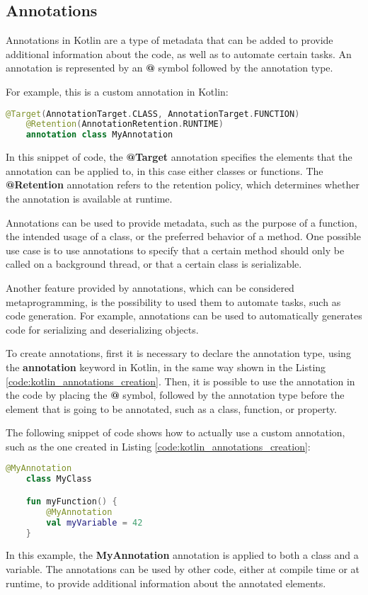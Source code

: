 \subsection{Annotations}
Annotations \cite{annotation_documentation} in Kotlin are a type of metadata that can be added to provide additional information about the code, as well as to automate certain tasks.\newline
An annotation is represented by an \textbf{@} symbol followed by the annotation type.

For example, this is a custom annotation in Kotlin:
\begin{lstlisting}[caption={Example of custom annotation in Kotlin}, language=Kotlin, captionpos=b, label={code:kotlin_annotations_creation}]
    @Target(AnnotationTarget.CLASS, AnnotationTarget.FUNCTION)
    @Retention(AnnotationRetention.RUNTIME)
    annotation class MyAnnotation
\end{lstlisting}
In this snippet of code, the \textbf{@Target} annotation specifies the elements that the annotation can be applied to, in this case either classes or functions. The \textbf{@Retention} annotation refers to the retention policy, which determines whether the annotation is available at runtime.

Annotations can be used to provide metadata, such as the purpose of a function, the intended usage of a class, or the preferred behavior of a method. One possible use case is to use annotations to specify that a certain method should only be called on a background thread, or that a certain class is serializable.

Another feature provided by annotations, which can be considered metaprogramming, is the possibility to used them to automate tasks, such as code generation. For example, annotations can be used to automatically generates code for serializing and deserializing objects.

To create annotations, first it is necessary to declare the annotation type, using the \textbf{annotation} keyword in Kotlin, in the same way shown in the Listing \ref{code:kotlin_annotations_creation}.\newline
Then, it is possible to use the annotation in the code by placing the \textbf{@} symbol, followed by the annotation type before the element that is going to be annotated, such as a class, function, or property.

The following snippet of code shows how to actually use a custom annotation, such as the one created in Listing \ref{code:kotlin_annotations_creation}:
\begin{lstlisting}[caption={Example of usage of a custom annotation in Kotlin}, language=Kotlin, captionpos=b, label={code:kotlin_annotations_usage}]
    @MyAnnotation
    class MyClass

    fun myFunction() {
        @MyAnnotation
        val myVariable = 42
    }
\end{lstlisting}
In this example, the \textbf{MyAnnotation} annotation is applied to both a class and a variable. The annotations can be used by other code, either at compile time or at runtime, to provide additional information about the annotated elements.

